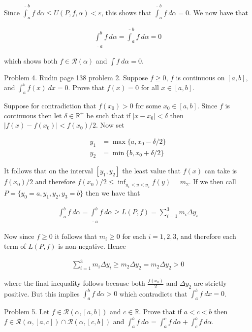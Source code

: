 \documentclass{article}
\begin{document}
  Since $\overline\int_a^b f \ d\alpha \leq U(P,f,\alpha)<\varepsilon$, this shows that $\overline\int_a^b f \ d\alpha =0$.  We now have that

  \begin{align*}
    \underline\int_a^b f\ d\alpha = \overline \int_a^b f \ d\alpha =0
  \end{align*}

  which shows both $f\in\mathscr R(\alpha)$ and $\int f \ d\alpha = 0$.

  \pagebreak
  {\Large \color{Sepia} Problem 4. Rudin page 138 problem 2. Suppose $f\geq 0$, $f$ is continuous on $[a,b]$, and $\int_a^b f(x)\ dx = 0$.  Prove that $f(x)=0$ for all $x\in [a,b]$.}

  \vspace{1cm}

  Suppose for contradiction that $f(x_0)>0$ for some $x_0\in[a,b]$.  Since $f$ is continuous then let $\delta\in\mathbb R^+$ be such that if $|x-x_0|<\delta$ then $|f(x)-f(x_0)| < f(x_0)/2$.  Now set

  \begin{align*}
    y_1 &= \max\{a, x_0-\delta/2\}\\
    y_2 &= \min\{b, x_0+\delta/2\}
  \end{align*}

  It follows that on the interval $[y_1,y_2]$ the least value that $f(x)$ can take is $f(x_0)/2$ and therefore $\displaystyle f(x_0)/2\leq \inf_{y_1<y<y_2} f(y)=m_2$.  If we then call $P=\{y_0=a,y_1,y_2,y_3=b\}$ then we have that

  \begin{align*}
    \int_a^b f \ d\alpha = \underline \int_a^b f\ d\alpha \geq L(P,f) = \sum_{i=1}^3 m_i \Delta y_i
  \end{align*}

  Now since $f\geq 0$ it follows that $m_i\geq 0$ for each $i=1,2,3$, and therefore each term of $L(P,f)$ is non-negative.  Hence

  \begin{align*}
    \sum_{i=1}^3 m_i\Delta y_i \geq m_2\Delta y_2 = m_2\Delta y_2 >0
  \end{align*}

  where the final inequality follows because both $\frac{f(x_0)}{2}$ and $\Delta y_2$ are strictly positive.  But this implies $\int_a^b f\ d\alpha>0$ which contradicts that $\int_a^b f\ dx = 0$.

  \pagebreak
  {\Large \color{Sepia} Problem 5. Let $f\in\mathscr R(\alpha,[a,b])$ and $c\in \mathbb R$.  Prove that if $a<c<b$ then $f\in \mathscr R(\alpha,[a,c])\cap \mathscr R(\alpha,[c,b])$ and $\int_a^b f\ d\alpha = \int_a^c f\ d\alpha+\int_c^b f\ d\alpha$. }
\end{document}
